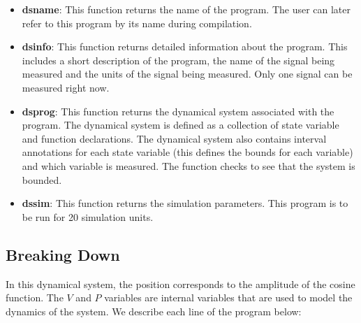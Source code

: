 \begin{itemize}
\item\textbf{dsname}: This function returns the name of the program. The user
  can later refer to this program by its name during compilation.
\item\textbf{dsinfo}: This function returns detailed information about the
  program. This includes a short description of the program, the name of the
  signal being measured and the units of the signal being measured. Only one
  signal can be measured right now.
\item\textbf{dsprog}: This function returns the dynamical system associated
  with the program. The dynamical system is defined as a collection of state variable and
  function declarations. The dynamical system also contains interval annotations
  for each state variable (this defines the bounds for each variable) and which
  variable is measured. The  function checks to see that the system
  is bounded. 
  \item\textbf{dssim}: This function returns the simulation parameters. This
    program is to be run for 20 simulation units.  
\end{itemize}

\subsection{Breaking Down }
In this dynamical system, the position  corresponds to the amplitude of
the cosine function. The $V$ and $P$ variables are internal variables that are
used to model the dynamics of the system. We describe each line of the program
below:

